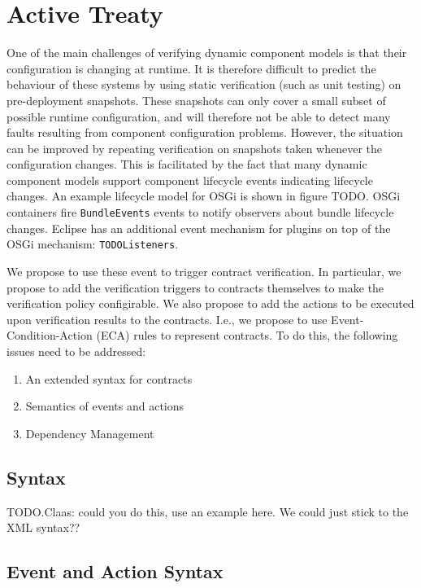 \documentclass{llncs}
\begin{document}
\section{Active Treaty}

One of the main challenges of verifying dynamic component models is that their configuration is changing at runtime. It is therefore difficult to predict the behaviour of these systems by using static verification (such as unit testing) on pre-deployment snapshots. These snapshots can only cover a small subset of possible runtime configuration, and will therefore not be able to detect many faults resulting from component configuration problems. However, the situation can 
be improved by repeating verification on snapshots taken whenever the configuration changes. This is facilitated by the fact that many dynamic component models support component lifecycle  events indicating lifecycle changes. 
An example lifecycle model for OSGi is shown in figure TODO. OSGi containers fire \texttt{BundleEvents} events to notify observers about bundle lifecycle changes. Eclipse has an additional event mechanism for plugins on top of the OSGi mechanism: \texttt{TODOListeners}.  

We propose to use these event to trigger contract verification. In particular, we propose to add the verification triggers to contracts themselves to make the verification policy configirable. We also propose to add the actions to be executed 
upon verification results to the contracts. I.e., we propose to use Event-Condition-Action (ECA) rules to represent contracts. To do this, the following issues need to be addressed:

\begin{enumerate}
\item An extended syntax for contracts
\item Semantics of events and actions
\item Dependency Management
\end{enumerate}


\subsection{Syntax}

TODO.Claas: could you do this, use an example here. We could just stick to the XML syntax??

\subsection{Event and Action Syntax} 
\end{document}
